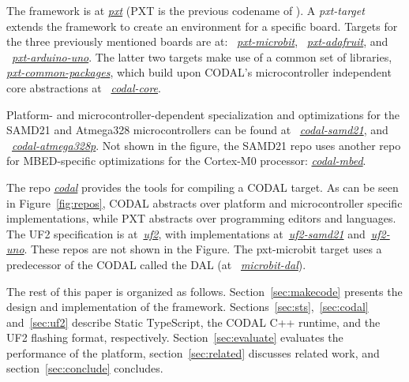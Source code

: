 The \MC framework 
is at \emph{\href{https://github.com/microsoft/pxt}{pxt}} (PXT is the previous codename of \MC). 
A \emph{pxt-target} extends the framework to create an environment for a specific board. Targets
for the three previously mentioned boards are at: 
~\emph{\href{https://github.com/microsoft/pxt-microbit}{pxt-microbit}}, 
~\emph{\href{https://github.com/microsoft/pxt-adafruit}{pxt-adafruit}}, and
~\emph{\href{https://github.com/microsoft/pxt-arduino-uno}{pxt-arduino-uno}}.
The latter two targets make use of a common set of libraries, 
\emph{\href{https://github.com/microsoft/pxt-common-packages}{pxt-common-packages}},
which build upon CODAL's microcontroller independent core abstractions at
~\emph{\href{https://github.com/lancaster-university/codal-core}{codal-core}}.  

Platform- and microcontroller-dependent specialization and optimizations for 
the SAMD21 and Atmega328 microcontrollers can be found at
~\emph{\href{https://github.com/lancaster-university/codal-samd21}{codal-samd21}}, 
and
~\emph{\href{https://github.com/lancaster-university/codal-atmega328p}{codal-atmega328p}}.
Not shown in the figure, the SAMD21 repo uses another repo for
MBED-specific optimizations for the Cortex-M0 processor: \emph{\href{https://github.com/lancaster-university/codal-mbed}{codal-mbed}}.

The repo \emph{\href{https://github.com/lancaster-university/codal}{codal}} provides the
tools for compiling a CODAL target.  As can be seen in Figure~\ref{fig:repos}, 
CODAL abstracts over platform and microcontroller specific
implementations, while PXT abstracts over programming editors and languages.
The UF2 specification is at~\emph{\href{https://github.com/microsoft/uf2}{uf2}},
with implementations at~\emph{\href{https://github.com/microsoft/uf2-samd21}{uf2-samd21}}
and~\emph{\href{https://github.com/mmoskal/uf2-uno}{uf2-uno}}. These repos are not
shown in the Figure. 
The pxt-microbit target uses a predecessor of the CODAL called the DAL (at
~\emph{\href{https://github.com/lancaster-university/microbit-dal}{microbit-dal}}).

The rest of this paper is organized as follows. Section~\ref{sec:makecode} presents the design 
and implementation of the \MC framework. 
Sections~\ref{sec:sts},~\ref{sec:codal} and~\ref{sec:uf2} describe Static TypeScript,
the CODAL C++ runtime, and the UF2 flashing format,
respectively.  Section~\ref{sec:evaluate} evaluates the performance of the platform,
section~\ref{sec:related} discusses related work, and section~\ref{sec:conclude}
concludes.
